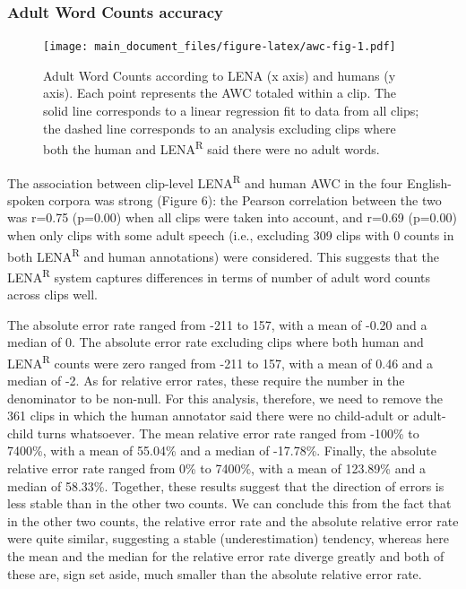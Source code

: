 \documentclass[english,table,man,floatsintext]{apa6}
\begin{document}
\hypertarget{adult-word-counts-accuracy}{%
\subsubsection{Adult Word Counts accuracy}\label{adult-word-counts-accuracy}}

\begin{figure}
\centering
\texttt{[image: main\_document\_files/figure-latex/awc-fig-1.pdf]}
\caption{\label{fig:awc-fig}Adult Word Counts according to LENA (x axis) and humans (y axis). Each point represents the AWC totaled within a clip. The solid line corresponds to a linear regression fit to data from all clips; the dashed line corresponds to an analysis excluding clips where both the human and LENA\textsuperscript{R} said there were no adult words.}
\end{figure}

The association between clip-level LENA\textsuperscript{R} and human AWC in the four English-spoken corpora was strong (Figure 6): the Pearson correlation between the two was r=0.75 (p=0.00) when all clips were taken into account, and r=0.69 (p=0.00) when only clips with some adult speech (i.e., excluding 309 clips with 0 counts in both LENA\textsuperscript{R} and human annotations) were considered. This suggests that the LENA\textsuperscript{R} system captures differences in terms of number of adult word counts across clips well.

The absolute error rate ranged from -211 to 157, with a mean of -0.20 and a median of 0. The absolute error rate excluding clips where both human and LENA\textsuperscript{R} counts were zero ranged from -211 to 157, with a mean of 0.46 and a median of -2. As for relative error rates, these require the number in the denominator to be non-null. For this analysis, therefore, we need to remove the 361 clips in which the human annotator said there were no child-adult or adult-child turns whatsoever. The mean relative error rate ranged from -100\% to 7400\%, with a mean of 55.04\% and a median of -17.78\%. Finally, the absolute relative error rate ranged from 0\% to 7400\%, with a mean of 123.89\% and a median of 58.33\%. Together, these results suggest that the direction of errors is less stable than in the other two counts. We can conclude this from the fact that in the other two counts, the relative error rate and the absolute relative error rate were quite similar, suggesting a stable (underestimation) tendency, whereas here the mean and the median for the relative error rate diverge greatly and both of these are, sign set aside, much smaller than the absolute relative error rate.
\end{document}
